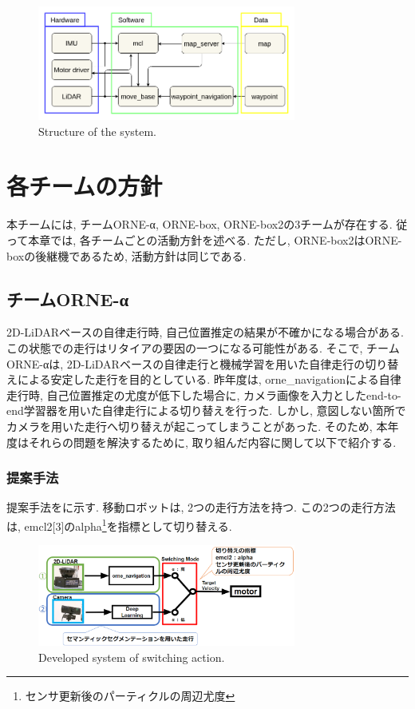 \documentclass[uplatex, twocolumn, 9pt]{jsproceedings}
\begin{document}
\begin{figure}[h]
  \centering
  \includegraphics[width=85mm]{fig/software.pdf}
  \caption{Structure of the system.}
  \label{fig:soft-fig}%
\end{figure}

\section{各チームの方針}
本チームには, チームORNE-α, ORNE-box, ORNE-box2の3チームが存在する. 従って本章では, 各チームごとの活動方針を述べる. ただし, ORNE-box2はORNE-boxの後継機であるため, 活動方針は同じである.

\subsection{チームORNE-α}
2D-LiDARベースの自律走行時, 自己位置推定の結果が不確かになる場合がある. この状態での走行はリタイアの要因の一つになる可能性がある. そこで, チームORNE-αは, 2D-LiDARベースの自律走行と機械学習を用いた自律走行の切り替えによる安定した走行を目的としている. 昨年度は, orne\_navigationによる自律走行時, 自己位置推定の尤度が低下した場合に, カメラ画像を入力としたend-to-end学習器を用いた自律走行による切り替えを行った. しかし, 意図しない箇所でカメラを用いた走行へ切り替えが起こってしまうことがあった. そのため, 本年度はそれらの問題を解決するために, 取り組んだ内容に関して以下で紹介する. 

\subsubsection{提案手法}
提案手法をに示す. 移動ロボットは, 2つの走行方法を持つ. この2つの走行方法は, emcl2[3]のalpha\footnote[1]{センサ更新後のパーティクルの周辺尤度}を指標として切り替える.

\begin{figure}[h]
  \centering
  \includegraphics[width=85mm]{fig/kirikae.pdf}
  \caption{Developed system of switching action.}
  \label{fig:kirikae}%
\end{figure}
\end{document}
